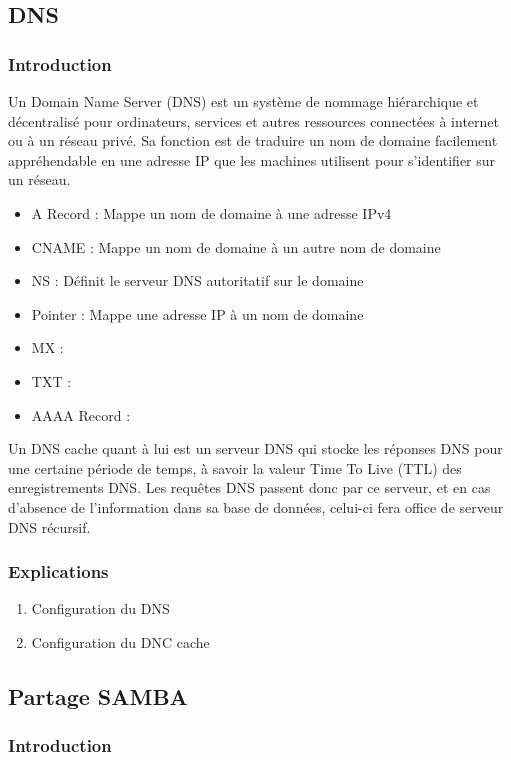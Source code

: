 \documentclass{article}
\begin{document}
	\subsection{DNS}
	\subsubsection{Introduction}
	Un Domain Name Server (DNS) est un système de nommage hiérarchique et décentralisé pour ordinateurs, services et autres ressources connectées à internet ou à un réseau privé. Sa fonction est de traduire un nom de domaine facilement appréhendable en une adresse IP que les machines utilisent pour s'identifier sur un réseau.
	
	\begin{itemize}
	\item A Record : Mappe un nom de domaine à une adresse IPv4
	\item CNAME : Mappe un nom de domaine à un autre nom de domaine
	\item NS : Définit le serveur DNS autoritatif sur le domaine
	\item Pointer : Mappe une adresse IP à un nom de domaine
	\item MX :
	\item TXT :
	\item AAAA Record :
	\end{itemize}
	
	Un DNS cache quant à lui est un serveur DNS qui stocke les réponses DNS pour une certaine période de temps, à savoir la valeur Time To Live (TTL) des enregistrements DNS. Les requêtes DNS passent donc par ce serveur, et en cas d'absence de l'information dans sa base de données, celui-ci fera office de serveur DNS récursif.

	\subsubsection{Explications}
	
	\begin{enumerate}
	\item Configuration du DNS
	\item Configuration du DNC cache
	
	\end{enumerate}	
	
	\subsection{Partage SAMBA}
	\subsubsection{Introduction}
\end{document}
